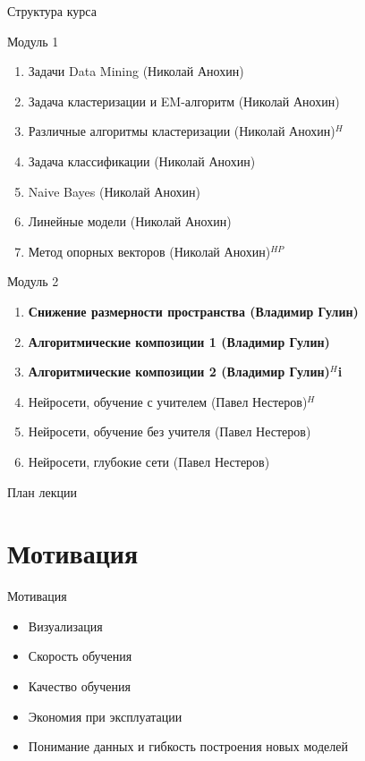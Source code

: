 \documentclass[10pt]{beamer}
\begin{document}
\begin{frame}{Структура курса}

{\small
Модуль 1
\begin{enumerate}
\item Задачи Data Mining (Николай Анохин)
\item Задача кластеризации и EM-алгоритм (Николай Анохин)
\item Различные алгоритмы кластеризации (Николай Анохин){\color{red}$^{H}$}
\item Задача классификации (Николай Анохин)
\item Naive Bayes (Николай Анохин)
\item Линейные модели (Николай Анохин)
\item Метод опорных векторов (Николай Анохин){\color{red}$^{HP}$}
\end{enumerate}

Модуль 2
\begin{enumerate}
\item \textbf{Снижение размерности пространства (Владимир Гулин)}
\item \textbf{Алгоритмические композиции 1 (Владимир Гулин)}
\item \textbf{Алгоритмические композиции 2 (Владимир Гулин){\color{red}$^{H}$}i}
\item Нейросети, обучение с учителем (Павел Нестеров){\color{red}$^{H}$}
\item Нейросети, обучение без учителя (Павел Нестеров)
\item Нейросети, глубокие сети (Павел Нестеров)
\end{enumerate}
}

\end{frame}

\begin{frame}{План лекции}
\tableofcontents
\end{frame}

\section{Мотивация}

\begin{frame}{Мотивация}
\begin{itemize}
\item Визуализация
\item Скорость обучения
\item Качество обучения
\item Экономия при эксплуатации
\item Понимание данных и гибкость построения новых моделей
\end{itemize}
\end{frame}
\end{document}
